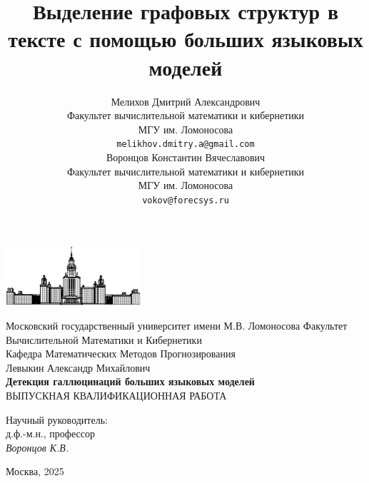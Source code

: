 \documentclass[12pt]{article}
\title{Выделение графовых структур в тексте с помощью больших языковых моделей}
\author{ Мелихов Дмитрий Александрович \\
        Факультет вычислительной математики и кибернетики \\
        МГУ им. Ломоносова \\
        \texttt{melikhov.dmitry.a@gmail.com} \\
	\And
	Воронцов Константин Вячеславович \\
        Факультет вычислительной математики и кибернетики \\
        МГУ им. Ломоносова \\
        \texttt{vokov@forecsys.ru} \\
}
\date{}
\begin{document}
\begin{titlepage}
\begin{center}
    


    \bigskip
    \includegraphics[width=50mm]{msu.eps}

    \bigskip
    Московский государственный университет имени М.В. Ломоносова
    Факультет Вычислительной Математики и Кибернетики \\
    Кафедра Математических Методов Прогнозирования \\
    \bigskip
    \bigskip
    \bigskip
    \bigskip
    \bigskip
    {\large Левыкин Александр Михайлович} \\
    \bigskip
    \bigskip
    \textsf{\Large\bfseries
        Детекция галлюцинаций больших языковых моделей \\[10mm]
    }
    ВЫПУСКНАЯ КВАЛИФИКАЦИОННАЯ РАБОТА \\[50mm]
    \begin{flushright}
        \parbox{0.3\textwidth}{
            Научный руководитель:\\
            д.ф.-м.н., профессор\\
            \emph{Воронцов К.В.}
        }
    \end{flushright}


    \vspace{\fill}
    Москва, 2025
\end{center}
\end{titlepage}
\end{document}
